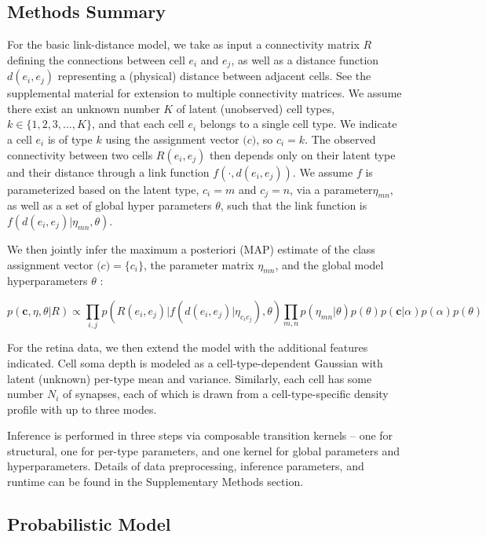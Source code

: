 \documentclass{article}
\renewcommand{\vec}[1]{\mathbf{#1}}
\begin{document}
\subsection*{Methods Summary}

For the basic link-distance model, we take as input a connectivity
matrix $R$ defining the connections between cell $e_i$ and $e_j$, as
well as a distance function $d(e_i, e_j)$ representing a (physical)
distance between adjacent cells.  See
the supplemental material for extension to multiple connectivity
matrices. We assume there exist an unknown number $K$ of latent
(unobserved) cell types, $k \in \{1, 2, 3, \dots, K\}$, and that each
cell $e_i$ belongs to a single cell type. We indicate a cell $e_i$ is
of type $k$ using the assignment vector $\vec(c)$, so $c_i = k$. The
observed connectivity between two cells $R(e_i, e_j)$ then depends
only on their latent type and their distance through a link function
$f(\cdot, d(e_i, e_j))$. We assume $f$ is parameterized based on the
latent type, $c_i=m$ and $c_j=n$, via a parameter$\eta_{mn}$, as well
as a set of global hyper parameters $\theta$, such that the link
function is $f(d(e_i, e_j) | \eta_{mn}, \theta)$.

We then jointly infer the maximum a posteriori (MAP) estimate of the
class assignment vector $\vec(c) = \{c_i\}$, the parameter matrix
$\eta_{mn}$, and the global model hyperparameters $\theta$ :

\begin{equation}
  p(\vec{c}, \eta, \theta | R ) \propto \prod_{i, j} p(R(e_i, e_j) | f(d(e_i, e_j) | \eta_{c_ic_j}), \theta) \prod_{m, n} p(\eta_{mn} | \theta)  p(\theta) p(\vec{c} | \alpha) p(\alpha) p(\theta)
\end{equation}

For the retina data, we then extend the model with the additional
features indicated. Cell soma depth is modeled as a
cell-type-dependent Gaussian with latent (unknown) per-type mean and
variance. Similarly, each cell has some number $N_i$ of synapses, 
each of which is drawn from a cell-type-specific density profile
with up to three modes.


Inference is performed in three steps via composable transition 
kernels -- one for structural, one for per-type parameters, and
one kernel for global parameters and hyperparameters. Details
of data preprocessing, inference parameters, and runtime can
be found in the Supplementary Methods section. 


\subsection*{Probabilistic Model}
\end{document}
